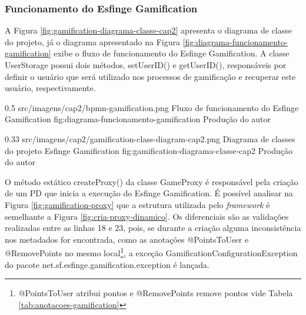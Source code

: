 \subsubsection{Funcionamento do Esfinge Gamification}

\par A Figura \ref{fig:gamification-diagrama-classe-cap2} apresenta o diagrama de classe do projeto, já o diagrama apresentado na Figura \ref{fig:diagrama-funcionamento-gamification} exibe o fluxo de funcionamento do Esfinge Gamification. A classe 
UserStorage possui dois métodos, setUserID() e getUserID(), responsáveis por definir o usuário que será utilizado nos processos de gamificação e recuperar este usuário, respectivamente.

\begin{image}
{0.5} %
{src/imagens/cap2/bpmn-gamification.png} %
{Fluxo de funcionamento do Esfinge Gamification} %
{fig:diagrama-funcionamento-gamification} %
{Produção do autor} %
\end{image}

\begin{image}
{0.33} %
{src/imagens/cap2/gamification-class-diagram-cap2.png} %
{Diagrama de classes do projeto Esfinge Gamification} %
{fig:gamification-diagrama-classe-cap2} %
{Produção do autor} %
\end{image}

\par O método estático createProxy() da classe GameProxy é responsável pela criação de um PD que inicia a execução do Esfinge Gamification. É possível analisar na Figura \ref{fig:gamification-proxy} que a estrutura utilizada pelo \textit{framework} é semelhante a Figura \ref{fig:cria-proxy-dinamico}. Os diferenciais são as validações realizadas entre as linhas 18 e 23, pois, se durante a criação alguma inconsistência nos metadados for encontrada, como as anotações @PointsToUser e  @RemovePoints no mesmo local\footnote{@PointsToUser atribui pontos e @RemovePoints remove pontos vide Tabela \ref{tab:anotacoes-gamification}}, a exceção GamificationConfigurationException do pacote net.sf.esfinge.gamification.exception é lançada. 

